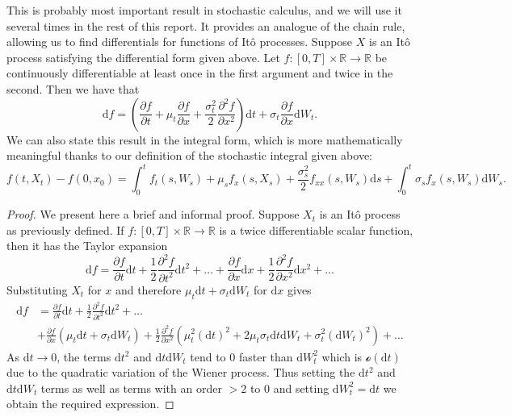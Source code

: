 \begin{lemma}[It\^{o}'s Lemma]
    This is probably most important result in stochastic calculus, and we will use 
    it several times in the rest of this report. It provides an analogue of the 
    chain rule, allowing us to find differentials for functions of It\^{o} processes. 
    Suppose $X$ is an It\^{o} process satisfying the differential form given above. 
    Let $f:[0,T]\times\mathbb{R}\rightarrow\mathbb{R}$ be continuously differentiable 
    at least once in the first argument and twice in the second. Then we have that
    \begin{equation}\label{eq:1.25}
        \mathrm df=\left(\frac{\partial f}{\partial t}+\mu_t\frac{\partial f}{\partial x}+\frac{\sigma_t^2}{2}\frac{\partial^2 f}{\partial x^2}\right)\mathrm dt + \sigma_t\frac{\partial f}{\partial x}\mathrm dW_t.
    \end{equation}
    We can also state this result in the integral form, which is more mathematically 
    meaningful thanks to our definition of the stochastic integral given above:
    \begin{equation}\label{eq:1.26}
        f(t,X_t)-f(0,x_0)=\int_0^tf_t(s,W_s)+\mu_sf_x(s,X_s)+\frac{\sigma_s^2}{2}f_{xx}(s,W_s)\mathrm ds+\int_0^t\sigma_sf_x(s,W_s)\mathrm dW_s.
    \end{equation}
\end{lemma}
\begin{proof}
    We present here a brief and informal proof. Suppose $X_t$ is an It\^{o} process
    as previously defined. If $f:[0,T]\times\mathbb{R}\rightarrow\mathbb{R}$ is a 
    twice differentiable scalar function, then it has the Taylor expansion
    \begin{equation*}
        \mathrm df = \frac{\partial f}{\partial t}\mathrm dt+\frac{1}{2}\frac{\partial^2f}{\partial t^2}\mathrm dt^2+\dots+\frac{\partial f}{\partial x}\mathrm dx+\frac{1}{2}\frac{\partial^2f}{\partial x^2}\mathrm dx^2+\dots
    \end{equation*}
    Substituting $X_t$ for $x$ and therefore $\mu_t\mathrm dt + \sigma_t\mathrm dW_t$
    for $\mathrm dx$ gives
    \begin{align*}
        \mathrm df &= \frac{\partial f}{\partial t}\mathrm dt+\frac{1}{2}\frac{\partial^2f}{\partial t^2}\mathrm dt^2+\dots\\
        &+\frac{\partial f}{\partial x}(\mu_t\mathrm dt + \sigma_t\mathrm dW_t)+\frac{1}{2}\frac{\partial^2f}{\partial x^2}(\mu_t^2(\mathrm dt)^2 + 2\mu_t\sigma_t\mathrm dt\mathrm dW_t+ \sigma_t^2(\mathrm dW_t)^2)+\dots
    \end{align*}
    As $\mathrm dt\rightarrow0$, the terms $\mathrm dt^2$ and $\mathrm dt\mathrm dW_t$ 
    tend to 0 faster than $\mathrm dW_t^2$ which is $\mathcal{o}(\mathrm dt)$ due to
    the quadratic variation of the Wiener process. Thus setting the $\mathrm dt^2$ 
    and $\mathrm dt\mathrm dW_t$ terms as well as terms with an order $>2$ to 0
    and setting $\mathrm dW_t^2=\mathrm dt$ we obtain the required expression.
\end{proof}

